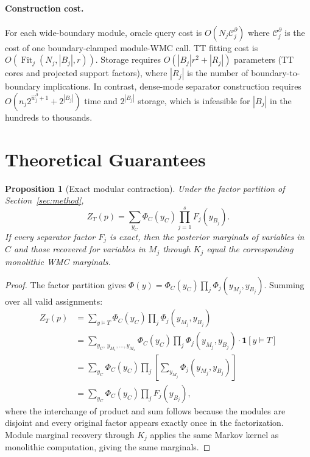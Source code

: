 \documentclass[12pt]{article}
\newtheorem{proposition}{Proposition}[section]
\begin{document}
\paragraph{Construction cost.}
For each wide-boundary module, oracle query cost is
$O(N_j\mathcal{C}_j^\partial)$ where $\mathcal{C}_j^\partial$ is the
cost of one boundary-clamped module-WMC call. TT fitting cost is
$O(\operatorname{Fit}_j(N_j,|B_j|,r))$. Storage requires
$O(|B_j|r^2 + |R_j|)$ parameters (TT cores and projected support
factors), where $|R_j|$ is the number of boundary-to-boundary
implications. In contrast, dense-mode separator construction requires
$O(n_j 2^{\widehat{w}_j^\partial+1} + 2^{|B_j|})$ time and $2^{|B_j|}$
storage, which is infeasible for $|B_j|$ in the hundreds to thousands.

\section{Theoretical Guarantees}
\label{sec:theory}

\begin{proposition}[Exact modular contraction]
\label{prop:exact-modular}
Under the factor partition of Section~\ref{sec:method},
\[
  Z_T(p) = \sum_{y_C}\Phi_C(y_C)\prod_{j=1}^{s} F_j(y_{B_j}).
\]
If every separator factor $F_j$ is exact, then the posterior marginals
of variables in $C$ and those recovered for variables in $M_j$ through
$K_j$ equal the corresponding monolithic WMC marginals.
\end{proposition}

\begin{proof}
The factor partition gives
$\Phi(y) = \Phi_C(y_C)\prod_j\Phi_j(y_{M_j},y_{B_j})$.
Summing over all valid assignments:
\begin{align*}
  Z_T(p)
  &= \sum_{y\models T} \Phi_C(y_C)\prod_j\Phi_j(y_{M_j},y_{B_j}) \\
  &= \sum_{y_C,\,y_{M_1},\ldots,y_{M_s}}
     \Phi_C(y_C)\prod_j\Phi_j(y_{M_j},y_{B_j})
     \cdot\mathbf{1}[y\models T] \\
  &= \sum_{y_C}\Phi_C(y_C)
     \prod_j\left[\sum_{y_{M_j}}\Phi_j(y_{M_j},y_{B_j})\right] \\
  &= \sum_{y_C}\Phi_C(y_C)\prod_j F_j(y_{B_j}),
\end{align*}
where the interchange of product and sum follows because the modules are
disjoint and every original factor appears exactly once in the
factorization. Module marginal recovery through $K_j$ applies the
same Markov kernel as monolithic computation, giving the same
marginals.
\end{proof}
\end{document}

